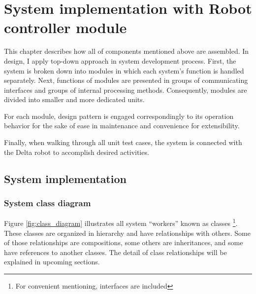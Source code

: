 \chapter{System implementation with Robot controller module}
\indent This chapter describes how all of components mentioned above are assembled. In design, I apply top-down approach in system development process. First, the system is broken down into modules in which each system's function is handled separately. Next, functions of modules are presented in groups of communicating interfaces and groups of internal processing methods. Consequently, modules are divided into smaller and more dedicated units.

For each module, design pattern is engaged correspondingly to its operation behavior for the sake of ease in maintenance and convenience for extensibility.

Finally, when walking through all unit test cases, the system is connected with the Delta robot to accomplish desired activities.

\section{System implementation}
\subsection{System class diagram}
Figure \ref{fig:class_diagram} illustrates all system ``workers'' known as classes \footnote{For convenient mentioning, interfaces are included}. These classes are organized in hierarchy and have relationships with others. Some of those relationships are compositions, some others are inheritances, and some have references to another classes. The detail of class relationships will be explained in upcoming sections.

